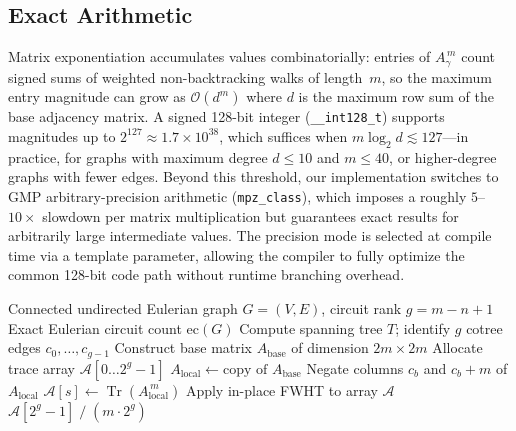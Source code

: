 \documentclass[acmsmall,review]{acmart}
\newcommand{\ec}{\text{ec}}
\newcommand{\bigO}{\mathcal{O}}
\DeclareMathOperator{\Tr}{Tr}
\begin{document}
	\subsection{Exact Arithmetic}
	\label{subsec:precision}
	Matrix exponentiation accumulates values combinatorially: entries of $A_\gamma^{\,m}$ count signed sums of weighted non-backtracking walks of length~$m$, so the maximum entry magnitude can grow as $\bigO(d^m)$ where $d$ is the maximum row sum of the base adjacency matrix. A signed 128-bit integer (\texttt{\_\_int128\_t}) supports magnitudes up to $2^{127} \approx 1.7 \times 10^{38}$, which suffices when $m \log_2 d \lesssim 127$---in practice, for graphs with maximum degree $d \le 10$ and $m \le 40$, or higher-degree graphs with fewer edges. Beyond this threshold, our implementation switches to GMP arbitrary-precision arithmetic (\texttt{mpz\_class}), which imposes a roughly $5$--$10\times$ slowdown per matrix multiplication but guarantees exact results for arbitrarily large intermediate values. The precision mode is selected at compile time via a template parameter, allowing the compiler to fully optimize the common 128-bit code path without runtime branching overhead.
	
	\begin{algorithm}[H]
		\caption{Eulerian Circuit Counting via FWHT (Implementation of the Luo Formula~\cite{Luo2025})}
		\label{alg:eulerian_fwht}
		\begin{algorithmic}[1]
			\Require Connected undirected Eulerian graph $G=(V, E)$, circuit rank $g = m - n + 1$
			\Ensure Exact Eulerian circuit count $\ec(G)$
			\State Compute spanning tree $T$; identify $g$ cotree edges $c_0, \ldots, c_{g-1}$
			\State Construct base matrix $A_{\text{base}}$ of dimension $2m \times 2m$
			\State Allocate trace array $\mathcal{A}[0 \ldots 2^g - 1]$
			 
			\State $A_{\text{local}} \gets \text{copy of } A_{\text{base}}$
			 
			\State Negate columns $c_b$ and $c_b + m$ of $A_{\text{local}}$
			\EndIf
			\EndFor
			\State $\mathcal{A}[s] \gets \Tr(A_{\text{local}}^{\,m})$ 
			\EndFor
			\State Apply in-place FWHT to array $\mathcal{A}$ 
			\State \Return $\mathcal{A}[2^g - 1] \;/\; (m \cdot 2^g)$
		\end{algorithmic}
	\end{algorithm}
	
\end{document}
